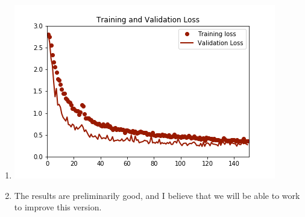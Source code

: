 \documentclass[12pt]{article} %
\begin{document}
\begin{enumerate}[label = (\roman*)]
\item \includegraphics{loss_history5v4}
\item The results are preliminarily good, and I believe that we will be able to work to improve this version.
\end{enumerate}
\end{document}
